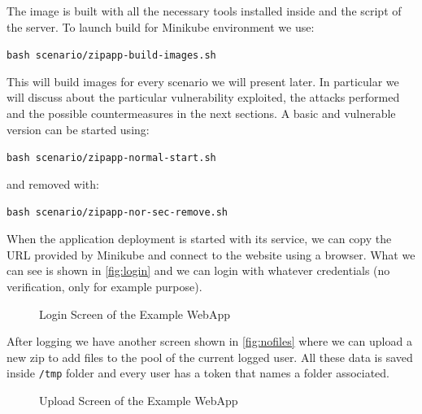 The image is built with all the necessary tools installed inside and the script of the server. To launch build for Minikube environment we use:

\texttt{bash scenario/zipapp-build-images.sh}

\noindent This will build images for every scenario we will present later. In particular we will discuss about the particular vulnerability exploited, the attacks performed and the possible countermeasures in the next sections. A basic and vulnerable version can be started using:

\texttt{bash scenario/zipapp-normal-start.sh}

\noindent and removed with:

\texttt{bash scenario/zipapp-nor-sec-remove.sh}

When the application deployment is started with its service, we can copy the URL provided by Minikube and connect to the website using a browser. What we can see is shown in \autoref{fig:login} and we can login with whatever credentials (no verification, only for example purpose).

\begin{figure}[H]
    \centering
    \caption{Login Screen of the Example WebApp}
    \label{fig:login}
\end{figure}

After logging we have another screen shown in \autoref{fig:nofiles} where we can upload a new zip to add files to the pool of the current logged user. All these data is saved inside \texttt{/tmp} folder and every user has a token that names a folder associated.

\begin{figure}[H]
    \centering
    \caption{Upload Screen of the Example WebApp}
    \label{fig:nofiles}
\end{figure}

